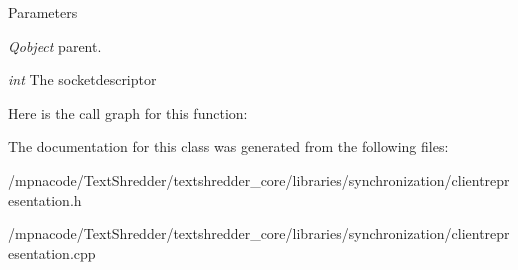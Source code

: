 \begin{DoxyParams}{Parameters}
\item[{\em Qobject}]parent. \item[{\em int}]The socketdescriptor \end{DoxyParams}


Here is the call graph for this function:




The documentation for this class was generated from the following files:\begin{DoxyCompactItemize}
\item 
/mpnacode/TextShredder/textshredder\_\-core/libraries/synchronization/clientrepresentation.h\item 
/mpnacode/TextShredder/textshredder\_\-core/libraries/synchronization/clientrepresentation.cpp\end{DoxyCompactItemize}
